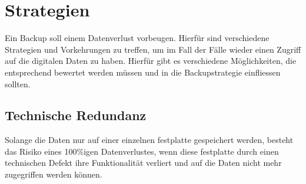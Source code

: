 

\section{Strategien}

Ein Backup soll einem Datenverlust vorbeugen. Hierfür sind verschiedene
Strategien und Vorkehrungen zu treffen, um im Fall der Fälle wieder einen
Zugriff auf die digitalen Daten zu haben. Hierfür gibt es verschiedene
Möglichkeiten, die entsprechend bewertet werden müssen und in die Backupstrategie
einfliessen sollten.

\subsection{Technische Redundanz}

Solange die Daten nur auf einer einzelnen \gls{festplatte} gespeichert werden,
besteht das Risiko eines 100\%igen Datenverlustes, wenn diese \gls{festplatte}
durch einen technischen Defekt ihre Funktionalität verliert und auf die Daten
nicht mehr zugegriffen werden können.
\bigskip

